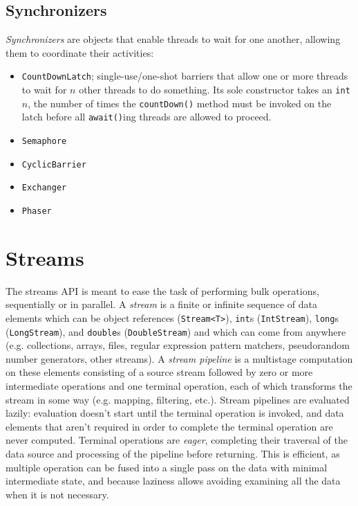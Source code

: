 \documentclass[8pt, table, xcdraw]{article}%
\begin{document}
\subsection{Synchronizers}

\emph{Synchronizers} are objects that enable threads to wait for one another, allowing them to coordinate their activities:

\begin{itemize}
    \item \lstinline{CountDownLatch}; single-use/one-shot barriers that allow one or more threads to wait for $n$ other threads to do something. Its sole constructor takes an \lstinline{int} $n$, the number of times the \lstinline{countDown()} method must be invoked on the latch before all \lstinline{await()}ing threads are allowed to proceed.
    \item \lstinline{Semaphore}
    \item \lstinline{CyclicBarrier}
    \item \lstinline{Exchanger}
    \item \lstinline{Phaser}
\end{itemize}

\section{Streams}

The streams API is meant to ease the task of performing bulk operations, sequentially or in parallel. A \emph{stream} is a finite or infinite sequence of data elements which can be object references (\lstinline{Stream<T>}), \lstinline{int}s (\lstinline{IntStream}), \lstinline{long}s (\lstinline{LongStream}), and \lstinline{double}s (\lstinline{DoubleStream}) and which can come from anywhere (e.g. collections, arrays, files, regular expression pattern matchers, pseudorandom number generators, other streams). A \emph{stream pipeline} is a multistage computation on these elements consisting of a source stream followed by zero or more intermediate operations and one terminal operation, each of which transforms the stream in some way (e.g. mapping, filtering, etc.). Stream pipelines are evaluated lazily: evaluation doesn't start until the terminal operation is invoked, and data elements that aren't required in order to complete the terminal operation are never computed. Terminal operations are \emph{eager}, completing their traversal of the data source and processing of the pipeline before returning. This is efficient, as multiple operation can be fused into a single pass on the data with minimal intermediate state, and because laziness allows avoiding examining all the data when it is not necessary.
\end{document}
